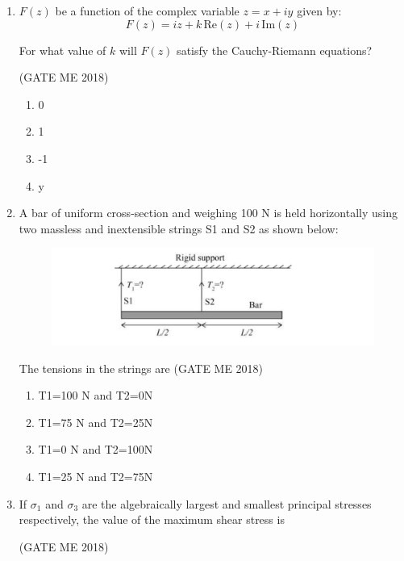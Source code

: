 \documentclass[journal]{IEEEtran}
\numberwithin{equation}{enumi}
\numberwithin{figure}{enumi}
\begin{document}
\begin{enumerate}
\item 
     \( F(z) \) be a function of the complex variable \( z = x + iy \) given by:
    \[
    F(z) = iz + k\, \text{Re}(z) + i\, \text{Im}(z)
    \]
    
    For what value of \( k \) will \( F(z) \) satisfy the Cauchy-Riemann equations?

  \hfill{(GATE ME 2018)}
  
    \begin{multicols}{2}
    \begin{enumerate}
        \item 0
        \item 1
        \item -1
        \item  y 
    \end{enumerate}
    \end{multicols}

    \item 
    A bar of uniform cross-section and weighing 100 N is held horizontally using two massless and inextensible strings S1 and S2 as shown below:

  
  
     \begin{figure}[H]
    \centering
    \includegraphics[width = 0.6\columnwidth]{figs/fig3.2.png}
    \caption*{}
    \label{fig:Q3}
    \end{figure}
     The tensions in the strings are
     \hfill{(GATE ME 2018)}
    \begin{enumerate}
 
      
     \item T1=100 N and T2=0N
    \item T1=75 N and T2=25N
        \item T1=0 N and T2=100N
        \item T1=25 N and T2=75N
    \end{enumerate}
\item If $\sigma_1$ and $\sigma_3$ are the algebraically largest and smallest principal stresses respectively, the value of the maximum shear stress is 

  \hfill{(GATE ME 2018)}
  

\end{enumerate}
\end{document}
